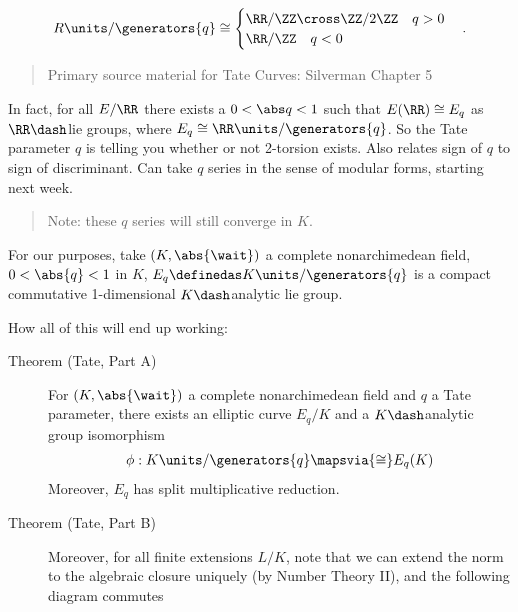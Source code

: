 \begin{align*}
R\units /\generators{q} \cong 
\begin{cases}
\RR/\ZZ \cross \ZZ/2\ZZ \quad q > 0 \\
\RR/\ZZ \quad q < 0
\end{cases}
.\end{align*}

\begin{quote}
Primary source material for Tate Curves: Silverman Chapter 5
\end{quote}

In fact, for all \(E/\RR\) there exists a \(0 < \abs q < 1\) such that
\(E(\RR) \cong E_q\) as \(\RR\dash\)lie groups, where
\(E_q \cong \RR\units / \generators{q}\). So the Tate parameter \(q\) is
telling you whether or not 2-torsion exists. Also relates sign of \(q\)
to sign of discriminant. Can take \(q\) series in the sense of modular
forms, starting next week.

\begin{quote}
Note: these \(q\) series will still converge in \(K\).
\end{quote}

For our purposes, take \((K, \abs{\wait})\) a complete nonarchimedean
field, \(0< \abs{q} < 1\) in \(K\),
\(E_q \definedas K\units/\generators{q}\) is a compact commutative
1-dimensional \(K\dash\)analytic lie group.

How all of this will end up working:

\begin{description}
\item[Theorem (Tate, Part A)]
For \((K, \abs{\wait})\) a complete nonarchimedean field and \(q\) a
Tate parameter, there exists an elliptic curve \(E_q/K\) and a
\(K\dash\)analytic group isomorphism
\begin{align*}
  \phi: K\units/\generators{q} \mapsvia{\cong} E_q(K)
  \end{align*} Moreover, \(E_q\) has split multiplicative reduction.
\item[Theorem (Tate, Part B)]
Moreover, for all finite extensions \(L/K\), note that we can extend the
norm to the algebraic closure uniquely (by Number Theory II), and the
following diagram commutes

\begin{center}\end{center}
\end{description}

